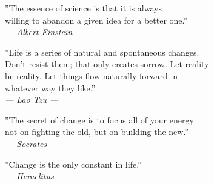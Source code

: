 \thispagestyle{plain}
\begin{center}
''The essence of science is that it is always \\
willing to abandon a given idea for a better one.''\\

\textit{--- Albert Einstein ---}
\end{center}

\begin{center}
''Life is a series of natural and spontaneous changes. \\
Don't resist them; that only creates sorrow. Let reality \\
be reality. Let things flow naturally forward in \\
whatever way they like.''\\

\textit{--- Lao Tzu ---}
\end{center}

\begin{center}
''The secret of change is to focus all of your energy \\
not on fighting the old, but on building the new.''\\

\textit{--- Socrates ---}
\end{center}

\begin{center}
''Change is the only constant in life.''\\

\textit{--- Heraclitus ---}
\end{center}
